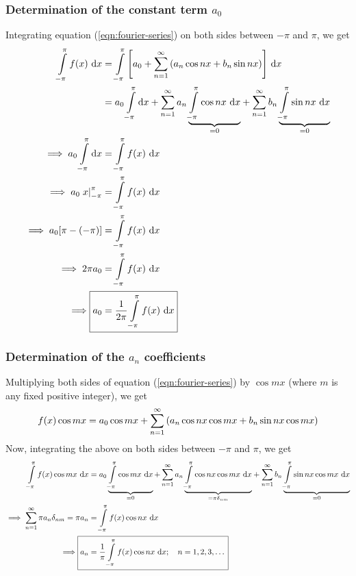         \subsubsection{Determination of the constant term $a_0$}
            Integrating equation (\ref{eqn:fourier-series}) on both sides between $-\pi$ and $\pi$, we get
            \begin{align}
                \int\limits_{-\pi}^{\pi}{f(x)\,\dd{x}}&=\int\limits_{-\pi}^{\pi}{\qty[a_0+\sum_{n=1}^{\infty}{\qty(a_n\cos{nx}+b_n\sin{nx})}]\,\dd{x}} \nonumber\\
                    &=a_0\int\limits_{-\pi}^{\pi}{\dd{x}}+\sum_{n=1}^{\infty}{a_n\underbrace{\int\limits_{-\pi}^{\pi}{\cos{nx}\,\dd{x}}}_{=0}}+\sum_{n=1}^{\infty}{b_n\underbrace{\int\limits_{-\pi}^{\pi}{\sin{nx}\,\dd{x}}}_{=0}} \nonumber\\
                \implies a_0\int\limits_{-\pi}^{\pi}{\dd{x}}&=\int\limits_{-\pi}^{\pi}{f(x)\,\dd{x}} \nonumber\\
                \implies a_0\left.x\right|_{-\pi}^{\pi}&=\int\limits_{-\pi}^{\pi}{f(x)\,\dd{x}} \nonumber\\
                \implies a_0\qty[\pi-(-\pi)]&=\int\limits_{-\pi}^{\pi}{f(x)\,\dd{x}} \nonumber\\
                \implies 2\pi a_0&=\int\limits_{-\pi}^{\pi}{f(x)\,\dd{x}} \nonumber\\
                \implies\Aboxed{a_0&=\dfrac{1}{2\pi}\int\limits_{-\pi}^{\pi}{f(x)\,\dd{x}}} \label{eqn:fourier-a0}
            \end{align}

        \subsubsection{Determination of the $a_n$ coefficients}
            Multiplying both sides of equation (\ref{eqn:fourier-series}) by $\cos{mx}$ (where $m$ is any fixed positive integer), we get
            \begin{align*}
                f(x)\cos{mx}=a_0\cos{mx}+\sum_{n=1}^{\infty}{\qty(a_n\cos{nx}\cos{mx}+b_n\sin{nx}\cos{mx})}
            \end{align*}
            Now, integrating the above on both sides between $-\pi$ and $\pi$, we get
            \begin{align}
                \int\limits_{-\pi}^{\pi}{f(x)\cos{mx}\,\dd{x}}&=a_0\underbrace{\int\limits_{-\pi}^{\pi}{\cos{mx}\,\dd{x}}}_{=0}+\sum_{n=1}^{\infty}{a_n\underbrace{\int\limits_{-\pi}^{\pi}{\cos{nx}\cos{mx}\,\dd{x}}}_{=\pi\delta_{nm}}}+\sum_{n=1}^{\infty}{b_n\underbrace{\int\limits_{-\pi}^{\pi}{\sin{nx}\cos{mx}\,\dd{x}}}_{=0}} \nonumber\\
                \implies\sum_{n=1}^{\infty}{\pi a_n\delta_{nm}}=\pi a_n&=\int\limits_{-\pi}^{\pi}{f(x)\cos{nx}\,\dd{x}} \nonumber\\
                \implies\Aboxed{a_n&=\dfrac{1}{\pi}\int\limits_{-\pi}^{\pi}{f(x)\cos{nx}\,\dd{x}};\quad n=1,2,3,\dots} \label{eqn:fourier-an}
            \end{align}

